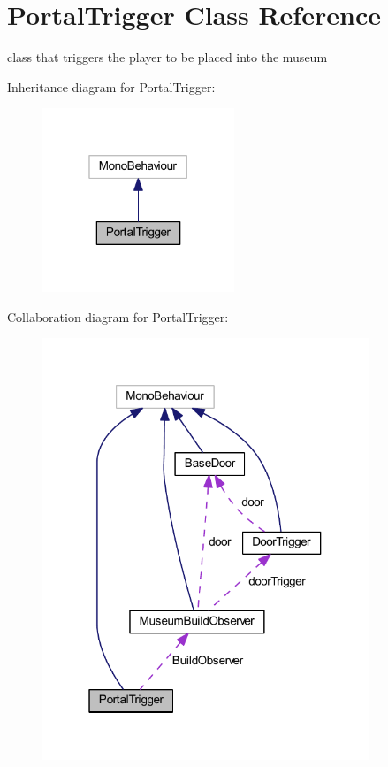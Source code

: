 \hypertarget{class_portal_trigger}{}\section{Portal\+Trigger Class Reference}
\label{class_portal_trigger}


class that triggers the player to be placed into the museum  




Inheritance diagram for Portal\+Trigger\+:
\nopagebreak
\begin{figure}[H]
\begin{center}
\leavevmode
\includegraphics[width=163pt]{class_portal_trigger__inherit__graph}
\end{center}
\end{figure}


Collaboration diagram for Portal\+Trigger\+:
\nopagebreak
\begin{figure}[H]
\begin{center}
\leavevmode
\includegraphics[width=277pt]{class_portal_trigger__coll__graph}
\end{center}
\end{figure}
